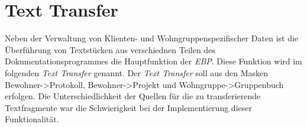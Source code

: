 \section{Text Transfer}
Neben der Verwaltung von Klienten- und Wohngruppenspezifischer Daten ist die Überführung von Textstücken aus verschiednen Teilen des
Dokumentationsprogrammes die Hauptfunktion der \textit{EBP}. Diese Funktion wird im folgenden \textit{Text Transfer} genannt. \newline
Der \textit{Text Transfer} soll aus den Masken Bewohner->Protokoll, Bewohner->Projekt und Wohngruppe->Gruppenbuch erfolgen. Die
Unterschiedlichkeit der Quellen für die zu transferierende Textfragmente war die Schwierigkeit bei der Implementierung dieser Funktionalität. 